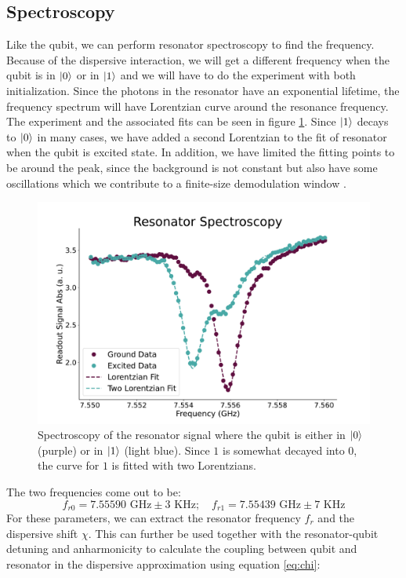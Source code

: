 \subsection{Spectroscopy}
Like the qubit, we can perform resonator spectroscopy to find the frequency. Because of the dispersive interaction, we will get a different frequency when the qubit is in $\ket{0}$ or in $\ket{1}$ and we will have to do the experiment with both initialization. Since the photons in the resonator have an exponential lifetime, the frequency spectrum will have Lorentzian curve around the resonance frequency. The experiment and the associated fits can be seen in figure \ref{fig:spectroscopy_resonator}. Since $\ket{1}$ decays to $\ket{0}$ in many cases, we have added a second Lorentzian to the fit of resonator when the qubit is excited state. In addition, we have limited the fitting points to be around the peak, since the background is not constant but also have some oscillations which we contribute to a finite-size demodulation window \cite{krantz_quantum_2019}.
\begin{figure}
    \centering
    \includegraphics{Calibrations/Figures/Resonator Spectroscopy.pdf}
    \caption{Spectroscopy of the resonator signal where the qubit is either in $\ket{0}$ (purple) or in $\ket{1}$ (light blue). Since $1$ is somewhat decayed into $0$, the curve for $1$ is fitted with two Lorentzians.}
    \label{fig:spectroscopy_resonator}
\end{figure}
The two frequencies come out to be:
\begin{equation}
     f_{r0} = 7.55590 \text{ GHz} \pm 3 \text{ KHz} ;\quad f_{r1} =  7.55439 \text{ GHz} \pm 7 \text{ KHz}
\end{equation}
For these parameters, we can extract the resonator frequency $f_r$ and the dispersive shift $\chi$. This can further be used together with the resonator-qubit detuning and anharmonicity to calculate the coupling between qubit and resonator in the dispersive approximation using equation \ref{eq:chi}:
